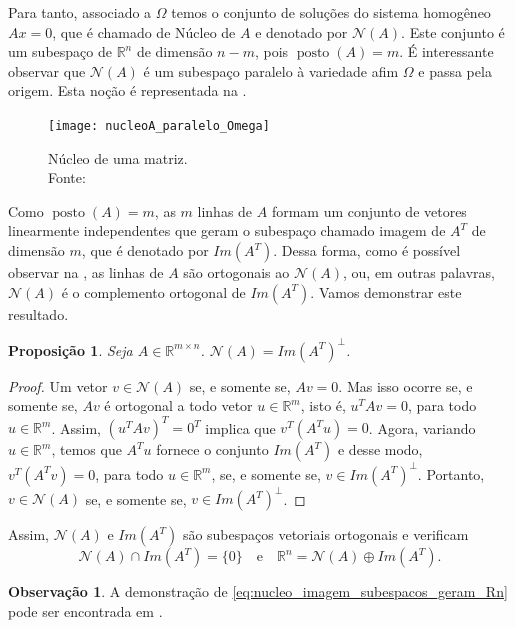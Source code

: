 \documentclass[12pt,a4paper]{scrartcl}
\DeclareMathOperator{\posto}{posto}
\def\RR{\mathds{R}}
\newtheorem{prop}{Proposição}
\theoremstyle{definition}%
\newtheorem{obs}{Observação}
\begin{document}
Para tanto, associado a $\Omega$ temos o conjunto de soluções do sistema homogêneo $Ax=0$, que é chamado de Núcleo de $A$ e denotado por $\mathcal{N}(A)$. Este conjunto é um subespaço de $\RR^{n}$ de dimensão $n-m$, pois $\posto (A)=m$. É interessante observar que $\mathcal{N}(A)$ é um subespaço paralelo à variedade afim $\Omega$ e passa pela origem. Esta noção é representada na .

\begin{figure}[!ht] 
	\centering
	\texttt{[image: nucleoA\_paralelo\_Omega]}
	\caption{ Núcleo de uma matriz. \\ Fonte: \textcite{Ana1994} \label{fig:nucleoA_paralelo_Omega}}
\end{figure}


Como $\posto (A)=m$, as $m$ linhas de $A$ formam um conjunto de vetores linearmente independentes que geram o subespaço chamado imagem de $A^{T}$ de dimensão $m$, que é denotado por $Im(A^{T})$. Dessa forma, como é possível observar na , as linhas de $A$ são ortogonais ao $\mathcal{N}(A)$, ou, em outras palavras, $\mathcal{N}(A)$ é o complemento ortogonal de $Im(A^{T})$. Vamos demonstrar este resultado. 

\begin{prop} \label{prop:complemento_ortogonal_nucleo}
Seja $A \in \RR^{m\times n}$. $\mathcal{N}(A) = Im(A^{T})^{\bot}$.
\end{prop}
\begin{proof}
Um vetor $v \in \mathcal{N}(A)$ se, e somente se, $Av=0$. Mas isso ocorre se, e somente se, $Av$ é ortogonal a todo vetor $u\in \RR^{m}$, isto é, $u^{T}Av=0$, para todo $u \in \RR^{m}$. Assim, $(u^{T}Av)^{T} = 0^{T}$ implica que $v^{T}(A^{T}u) = 0$. Agora, variando $u \in \RR^{m}$, temos que $A^{T}u$ fornece o conjunto $Im(A^{T})$ e desse modo, $v^{T}(A^{T}v) = 0$, para todo $u \in \RR^{m}$, se, e somente se, $v \in Im(A^{T})^{\bot}$. Portanto, $v\in \mathcal{N}(A)$ se, e somente se, $v\in Im(A^{T})^{\bot}$.
\end{proof}

Assim, $\mathcal{N}(A)$ e $Im(A^{T})$ são subespaços vetoriais ortogonais e verificam
\[ \label{eq:nucleo_imagem_subespacos_geram_Rn} \mathcal{N}(A) \cap Im(A^{T}) = \{ 0 \} \quad \text{e} \quad \RR^{n} = \mathcal{N}(A) \oplus Im(A^{T}) .\]
\begin{obs} 
A demonstração de \eqref{eq:nucleo_imagem_subespacos_geram_Rn} pode ser encontrada em \textcite{Elon2014}.
\end{obs}
\end{document}
